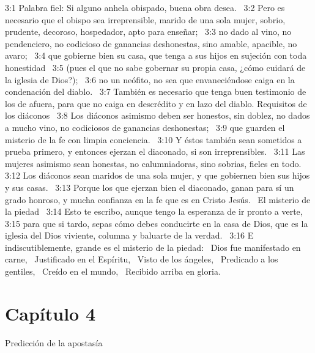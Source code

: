 3:1 Palabra fiel: Si alguno anhela obispado, buena obra desea.  
3:2 Pero es necesario que el obispo sea irreprensible, marido de una sola mujer, sobrio, prudente, decoroso, hospedador, apto para enseñar;  
3:3 no dado al vino, no pendenciero, no codicioso de ganancias deshonestas, sino amable, apacible, no avaro;  
3:4 que gobierne bien su casa, que tenga a sus hijos en sujeción con toda honestidad  
3:5 (pues el que no sabe gobernar su propia casa, ¿cómo cuidará de la iglesia de Dios?);  
3:6 no un neófito, no sea que envaneciéndose caiga en la condenación del diablo.  
3:7 También es necesario que tenga buen testimonio de los de afuera, para que no caiga en descrédito y en lazo del diablo. 
Requisitos de los diáconos  
3:8 Los diáconos asimismo deben ser honestos, sin doblez, no dados a mucho vino, no codiciosos de ganancias deshonestas;  
3:9 que guarden el misterio de la fe con limpia conciencia.  
3:10 Y éstos también sean sometidos a prueba primero, y entonces ejerzan el diaconado, si son irreprensibles.  
3:11 Las mujeres asimismo sean honestas, no calumniadoras, sino sobrias, fieles en todo.  
3:12 Los diáconos sean maridos de una sola mujer, y que gobiernen bien sus hijos y sus casas.  
3:13 Porque los que ejerzan bien el diaconado, ganan para sí un grado honroso, y mucha confianza en la fe que es en Cristo Jesús.  
El misterio de la piedad  
3:14 Esto te escribo, aunque tengo la esperanza de ir pronto a verte,  
3:15 para que si tardo, sepas cómo debes conducirte en la casa de Dios, que es la iglesia del Dios viviente, columna y baluarte de la verdad.  
3:16 E indiscutiblemente, grande es el misterio de la piedad:  
Dios fue manifestado en carne,  
Justificado en el Espíritu,  
Visto de los ángeles,  
Predicado a los gentiles,  
Creído en el mundo,  
Recibido arriba en gloria.  
\section*{Capítulo 4 }
Predicción de la apostasía  

